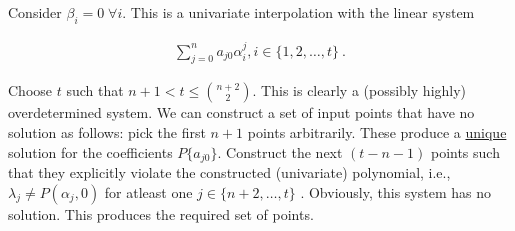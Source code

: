 Consider \(\beta_i = 0 \;\forall i\). This is a univariate interpolation with the
linear system

\begin{gather*}
    \sum_{j = 0}^n a_{j0}\alpha_i^j, i \in \{1, 2, \ldots, t\}~.
\end{gather*}

Choose \(t\) such that \(n+1 < t \leq \binom{n+2}{2}\). This is clearly a
(possibly highly) overdetermined system. We can construct a set of input points
that have no solution as follows: pick the first \(n+1\) points arbitrarily.
These produce a \underline{unique} solution for the coefficients
\(P\{a_{j0}\}\). Construct the next \((t-n-1)\) points such that they explicitly
violate the constructed (univariate) polynomial, i.e., \(\lambda_j \not =
P(\alpha_j, 0)\) for atleast one \(j \in \{n+2, \ldots, t\}\) 
. Obviously, this system has no solution. This produces the required set of
points.